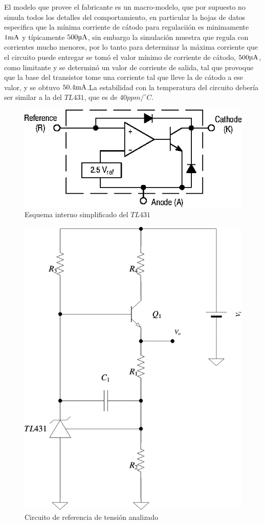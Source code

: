 El modelo que provee el fabricante es un macro-modelo, que por supuesto no simula todos los detalles del comportamiento, en particular la hojas de datos especifica que la mínima corriente de cátodo para regulaciión es minimamente $1 \si[per-mode=symbol]{\milli\ampere}$ y típicamente $500 \si[per-mode=symbol]{\micro\ampere}$, sin embargo la simulación muestra que regula con corrientes mucho menores, por lo tanto para determinar la máxima corriente que el circuito puede entregar se tomó el valor mínimo de corriente de cátodo, $500 \si[per-mode=symbol]{\micro\ampere}$, como limitante y se determinó un valor de corriente de salida, tal que provoque que la base del transistor tome una corriente tal que lleve la de cátodo a ese valor, y se obtuvo $50.4 \si[per-mode=symbol]{\milli\ampere}$.La estabilidad con la temperatura del circuito debería ser similar a la del $TL431$, que es de $40 ppm/^{\circ}C$.



\begin{figure}[H] %
\begin{center}
\includegraphics[width=0.65 \textwidth, angle=0]{./img/voltage_reference/reference2.png}
\end{center}
\caption{\label{fig:fig_vref_cir_2}\footnotesize{Esquema interno simplificado del $TL431$}}
\end{figure}



\begin{figure}[H] %
\begin{center}
\includegraphics[width=0.50 \textwidth, angle=0]{./img/voltage_reference/reference1.png}
\caption{\label{fig:fig_vref_cir_1}\footnotesize{Circuito de referencia de tensión analizado}}
\end{center}
\end{figure}



\clearpage